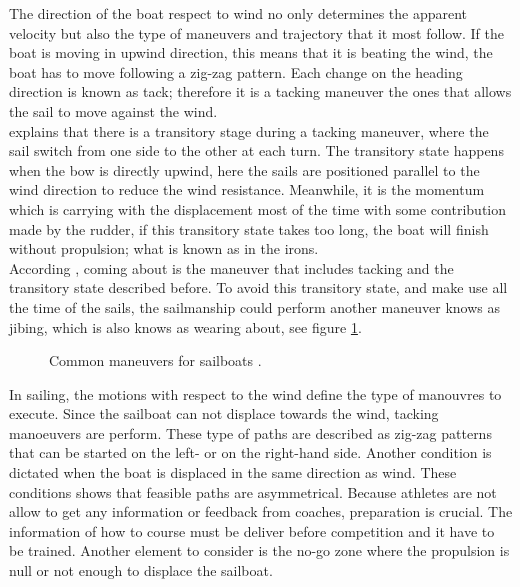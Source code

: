 The direction of the boat respect to wind no only determines the apparent velocity but also the type of maneuvers and trajectory that it most follow. If the boat is moving in upwind direction, this means that it is beating the wind, the boat has to move following a zig-zag pattern.  Each change on the heading direction is known as tack; therefore it is a tacking maneuver the ones that allows the sail to move against the wind. \\ \cite{denny2009float} explains that there is a transitory stage during a tacking maneuver, where the sail switch from one side to the other at each turn.  The transitory state happens when the bow is directly upwind, here the sails are positioned parallel to the wind direction to reduce the wind resistance. Meanwhile, it is the momentum which is carrying with the displacement most of the time with some contribution made by the rudder, if this transitory state takes too long, the boat will finish without propulsion; what is known as in the irons. \\According \cite{denny2009float}, coming about is the maneuver that includes tacking and the transitory state described before.  To avoid this transitory state, and make use all the time of the sails, the sailmanship could perform another maneuver knows as jibing, which is also knows as wearing about, see figure \ref{manoeuvers}.\par 

\begin{figure}[ht]
  \centering
  \hfill
   \centering
  \caption{Common maneuvers for sailboats \cite{denny2009float}.}
\label{manoeuvers} 
\end{figure}

In sailing, the motions with respect to the wind define the type of manouvres to execute.  Since the sailboat can not displace towards the wind, tacking manoeuvers are perform. These type of paths are described as zig-zag patterns that can be started on the left- or on the right-hand side. Another condition is dictated when the boat is displaced in the same direction as wind. These conditions shows that feasible paths are asymmetrical\cite{dolinskaya2012optimal}. Because athletes are not allow to get any information or feedback from coaches, preparation is crucial. The information of how to course must be deliver before competition and it have to be trained. Another element to consider is the no-go zone where the propulsion is null or not enough to displace the sailboat\cite{yang2011control}.


